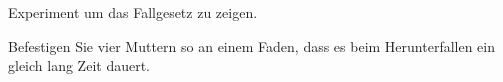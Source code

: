 Experiment um das Fallgesetz zu zeigen.

Befestigen Sie vier Muttern so an einem Faden, dass es beim Herunterfallen ein gleich lang Zeit dauert.


